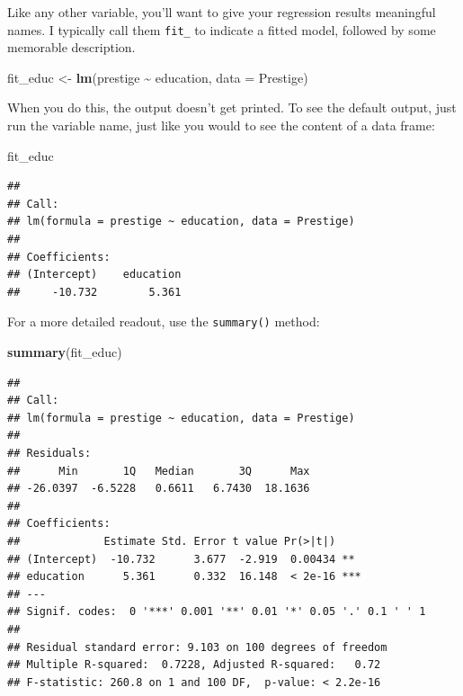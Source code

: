 \documentclass[
  12pt,
  oneside,openany]{book}
\newenvironment{Shaded}{\begin{snugshade}}{\end{snugshade}}
\newcommand{\DataTypeTok}[1]{\textcolor[rgb]{0.13,0.29,0.53}{#1}}
\newcommand{\KeywordTok}[1]{\textcolor[rgb]{0.13,0.29,0.53}{\textbf{#1}}}
\newcommand{\NormalTok}[1]{#1}
\newcommand{\OperatorTok}[1]{\textcolor[rgb]{0.81,0.36,0.00}{\textbf{#1}}}
\newcommand{\StringTok}[1]{\textcolor[rgb]{0.31,0.60,0.02}{#1}}
\begin{document}
Like any other variable, you'll want to give your regression results meaningful names. I typically call them \texttt{fit\_} to indicate a fitted model, followed by some memorable description.

\begin{Shaded}
\begin{Highlighting}[]
\NormalTok{fit\_educ <{-}}\StringTok{ }\KeywordTok{lm}\NormalTok{(prestige }\OperatorTok{\textasciitilde{}}\StringTok{ }\NormalTok{education, }\DataTypeTok{data =}\NormalTok{ Prestige)}
\end{Highlighting}
\end{Shaded}

When you do this, the output doesn't get printed. To see the default output, just run the variable name, just like you would to see the content of a data frame:

\begin{Shaded}
\begin{Highlighting}[]
\NormalTok{fit\_educ}
\end{Highlighting}
\end{Shaded}

\begin{verbatim}
## 
## Call:
## lm(formula = prestige ~ education, data = Prestige)
## 
## Coefficients:
## (Intercept)    education  
##     -10.732        5.361
\end{verbatim}

For a more detailed readout, use the \texttt{summary()} method:

\begin{Shaded}
\begin{Highlighting}[]
\KeywordTok{summary}\NormalTok{(fit\_educ)}
\end{Highlighting}
\end{Shaded}

\begin{verbatim}
## 
## Call:
## lm(formula = prestige ~ education, data = Prestige)
## 
## Residuals:
##      Min       1Q   Median       3Q      Max 
## -26.0397  -6.5228   0.6611   6.7430  18.1636 
## 
## Coefficients:
##             Estimate Std. Error t value Pr(>|t|)    
## (Intercept)  -10.732      3.677  -2.919  0.00434 ** 
## education      5.361      0.332  16.148  < 2e-16 ***
## ---
## Signif. codes:  0 '***' 0.001 '**' 0.01 '*' 0.05 '.' 0.1 ' ' 1
## 
## Residual standard error: 9.103 on 100 degrees of freedom
## Multiple R-squared:  0.7228, Adjusted R-squared:   0.72 
## F-statistic: 260.8 on 1 and 100 DF,  p-value: < 2.2e-16
\end{verbatim}
\end{document}
